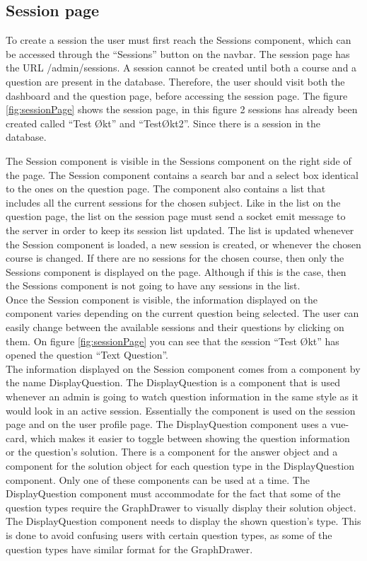 \subsection{Session page}
To create a session the user must first reach the Sessions component, which can be accessed through the “Sessions” button on the navbar. The session page has the URL /admin/sessions. A session cannot be created until both a course and a question are present in the database. Therefore, the user should visit both the dashboard and the question page, before accessing the session page. The figure \ref{fig:sessionPage} shows the session page, in this figure 2 sessions has already been created called “Test Økt” and “TestØkt2”. Since there is a session in the database. 

The Session component is visible in the Sessions component on the right side of the page. The Session component contains a search bar and a select box identical to the ones on the question page. The component also contains a list that includes all the current sessions for the chosen subject. Like in the list on the question page, the list on the session page must send a socket emit message to the server in order to keep its session list updated. The list is updated whenever the Session component is loaded, a new session is created, or whenever the chosen course is changed. If there are no sessions for the chosen course, then only the Sessions component is displayed on the page. Although if this is the case, then the Sessions component is not going to have any sessions in the list.
\\[11pt]
Once the Session component is visible, the information displayed on the component varies depending on the current question being selected. The user can easily change between the available sessions and their questions by clicking on them. On figure \ref{fig:sessionPage} you can see that the session “Test Økt” has opened the question “Text Question”. 
\\[11pt]
The information displayed on the Session component comes from a component by the name DisplayQuestion. The DisplayQuestion is a component that is used whenever an admin is going to watch question information in the same style as it would look in an active session. Essentially the component is used on the session page and on the user profile page. The DisplayQuestion component uses a vue-card, which makes it easier to toggle between showing the question information or the question's solution. There is a component for the answer object and a component for the solution object for each question type in the DisplayQuestion component. Only one of these components can be used at a time. The DisplayQuestion component must accommodate for the fact that some of the question types require the GraphDrawer to visually display their solution object. The DisplayQuestion component needs to display the shown question’s type. This is done to avoid confusing users with certain question types, as some of the question types have similar format for the GraphDrawer.
